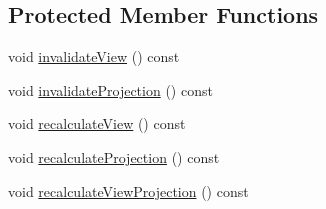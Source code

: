 \subsection*{Protected Member Functions}
\begin{DoxyCompactItemize}
\item 
void \hyperlink{class_camera_ada8eafa78187469b93a22e2cc97d49f8}{invalidate\+View} () const 
\item 
void \hyperlink{class_camera_a8067b4207b1a429318159059fac186c0}{invalidate\+Projection} () const 
\item 
void \hyperlink{class_camera_aa1ce6744a19131677ee890325032e749}{recalculate\+View} () const 
\item 
void \hyperlink{class_camera_adba918d86364f5452cad93a9ec6ea6d6}{recalculate\+Projection} () const 
\item 
void \hyperlink{class_camera_ae4c6dcfee420eb57f9521d5195ce78f8}{recalculate\+View\+Projection} () const 
\end{DoxyCompactItemize}
